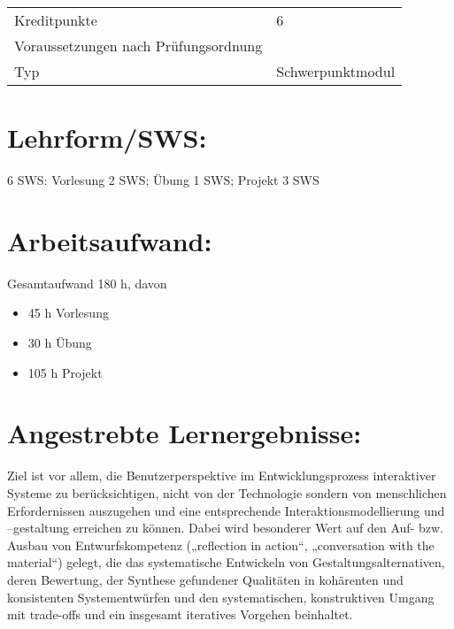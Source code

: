 \begin{longtable}[]{@{}ll@{}}
\begin{minipage}[t]{0.12\columnwidth}\raggedright\strut
Kreditpunkte\strut
\end{minipage} & \begin{minipage}[t]{0.12\columnwidth}\raggedright\strut
6\strut
\end{minipage}\tabularnewline
\begin{minipage}[t]{0.12\columnwidth}\raggedright\strut
Voraussetzungen nach Prüfungsordnung\strut
\end{minipage} & \begin{minipage}[t]{0.12\columnwidth}\raggedright\strut
\strut
\end{minipage}\tabularnewline
\begin{minipage}[t]{0.12\columnwidth}\raggedright\strut
Typ\strut
\end{minipage} & \begin{minipage}[t]{0.12\columnwidth}\raggedright\strut
Schwerpunktmodul\strut
\end{minipage}\tabularnewline
\bottomrule
\end{longtable}

\section*{Lehrform/SWS:}\label{lehrformsws-11}

6 SWS: Vorlesung 2 SWS; Übung 1 SWS; Projekt 3 SWS

\section*{Arbeitsaufwand:}\label{arbeitsaufwand-11}

Gesamtaufwand 180 h, davon

\begin{itemize}
\item
  45 h Vorlesung
\item
  30 h Übung
\item
  105 h Projekt
\end{itemize}

\section*{Angestrebte
Lernergebnisse:}\label{angestrebte-lernergebnisse-11}

Ziel ist vor allem, die Benutzerperspektive im Entwicklungsprozess
interaktiver Systeme zu berücksichtigen, nicht von der Technologie
sondern von menschlichen Erfordernissen auszugehen und eine
entsprechende Interaktionsmodellierung und --gestaltung erreichen zu
können. Dabei wird besonderer Wert auf den Auf- bzw. Ausbau von
Entwurfskompetenz („reflection in action``, „conversation with the
material``) gelegt, die das systematische Entwickeln von
Gestaltungsalternativen, deren Bewertung, der Synthese gefundener
Qualitäten in kohärenten und konsistenten Systementwürfen und den
systematischen, konstruktiven Umgang mit trade-offs und ein insgesamt
iteratives Vorgehen beinhaltet.

